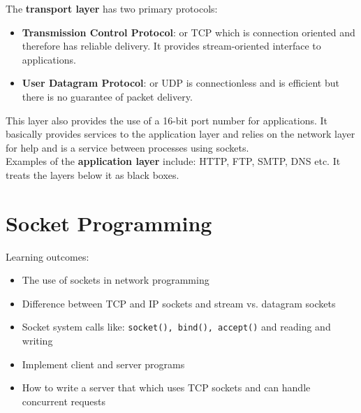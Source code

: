 \documentclass[twoside]{article}
\begin{document}
The \textbf{transport layer} has two primary protocols:
\begin{itemize}
    \item \textbf{Transmission Control Protocol}: or TCP which is connection
    oriented and therefore has reliable delivery. It provides stream-oriented
    interface to applications.
    \item \textbf{User Datagram Protocol}: or UDP is connectionless and is 
    efficient but there is no guarantee of packet delivery.
\end{itemize}
This layer also provides the use of a 16-bit port number for applications. It
basically provides services to the application layer and relies on the network
layer for help and is a service between processes using sockets.\\

Examples of the \textbf{application layer} include: HTTP, FTP, SMTP, DNS etc.
It treats the layers below it as black boxes.

\section{Socket Programming}
Learning outcomes:
\begin{itemize}
    \item The use of sockets in network programming
    \item Difference between TCP and IP sockets and stream vs. datagram 
    sockets
    \item Socket system calls like: \texttt{socket(), bind(), accept()} and
    reading and writing
    \item Implement client and server programs
    \item How to write a server that which uses TCP sockets and can handle
    concurrent requests
\end{itemize}
\end{document}
